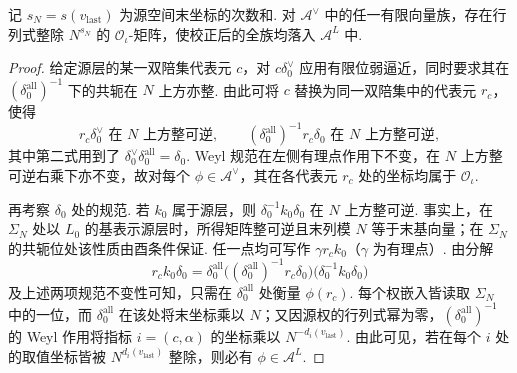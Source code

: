 \begin{lemma}
\label{lem:a-level-diagonal-colength}
\emitthmsource
记 $s_N=s(v_{\mathrm{last}})$ 为源空间末坐标的次数和. 对 $\mathcal A^\vee$ 中的任一有限向量族，存在行列式整除 $N^{s_N}$ 的 $\mathcal O_\iota$-矩阵，使校正后的全族均落入 $\mathcal A^L$ 中.
\end{lemma}
\begin{proof}
给定源层的某一双陪集代表元 $c$，对 $c\delta_0^\vee$ 应用有限位弱逼近，同时要求其在 $(\delta_0^{\mathrm{all}})^{-1}$ 下的共轭在 $N$ 上方亦整. 由此可将 $c$ 替换为同一双陪集中的代表元 $r_c$，使得
\[
 r_c\delta_0^\vee\text{ 在 }N\text{ 上方整可逆},\qquad
 (\delta_0^{\mathrm{all}})^{-1}r_c\delta_0\text{ 在 }N\text{ 上方整可逆},
\]
其中第二式用到了 $\delta_0^\vee \delta_0^{\mathrm{all}}=\delta_0$. Weyl 规范在左侧有理点作用下不变，在 $N$ 上方整可逆右乘下亦不变，故对每个 $\phi\in\mathcal A^\vee$，其在各代表元 $r_c$ 处的坐标均属于 $\mathcal O_\iota$.

再考察 $\delta_0$ 处的规范. 若 $k_0$ 属于源层，则 $\delta_0^{-1}k_0\delta_0$ 在 $N$ 上方整可逆. 事实上，在 $\Sigma_N$ 处以 $L_0$ 的基表示源层时，所得矩阵整可逆且末列模 $N$ 等于末基向量；在 $\Sigma_N$ 的共轭位处该性质由酉条件保证. 任一点均可写作 $\gamma r_ck_0$（$\gamma$ 为有理点）. 由分解
\[
 r_ck_0\delta_0
   =\delta_0^{\mathrm{all}}\bigl((\delta_0^{\mathrm{all}})^{-1}r_c\delta_0\bigr)
                  \bigl(\delta_0^{-1}k_0\delta_0\bigr)
\]
及上述两项规范不变性可知，只需在 $\delta_0^{\mathrm{all}}$ 处衡量 $\phi(r_c)$. 每个权嵌入皆读取 $\Sigma_N$ 中的一位，而 $\delta_0^{\mathrm{all}}$ 在该处将末坐标乘以 $N$；又因源权的行列式幂为零，$(\delta_0^{\mathrm{all}})^{-1}$ 的 Weyl 作用将指标 $i=(c,\alpha)$ 的坐标乘以 $N^{-d_i(v_{\mathrm{last}})}$. 由此可见，若在每个 $i$ 处的取值坐标皆被 $N^{d_i(v_{\mathrm{last}})}$ 整除，则必有 $\phi\in\mathcal A^L$.


\end{proof}
